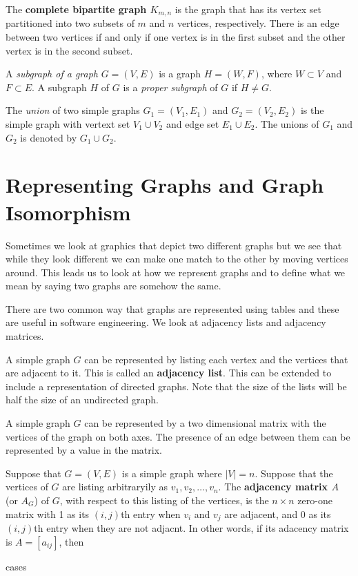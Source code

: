 \begin{definition}
The \textbf{complete bipartite graph $K_{m,n}$} is the graph that has its vertex set partitioned into two subsets of $m$ and $n$  vertices, respectively. There is an edge between two vertices if and only if one vertex is in the first subset and the other vertex is in the second subset. 
\end{definition}

\begin{definition}
A \textit{subgraph of a graph} $G=(V,E)$ is a graph $H=(W,F)$, where $ W \subset V$ and $F \subset E$. A subgraph $H$ of $G$ is a \textit{proper subgraph} of $G$ if $H \neq G$.
\end{definition}

\begin{definition}
The \textit{union} of two simple graphs $G_1 = (V_1,E_1)$ and $G_2=(V_2,E_2)$ is the simple graph with vertext set $V_1 \cup V_2$ and edge set $E_1 \cup E_2$. The unions of $G_1$ and $G_2$ is denoted by $G_1 \cup G_2$.
\end{definition}


\section {Representing Graphs and Graph Isomorphism}
Sometimes we look at graphics that depict two different graphs but we see that while they look different we can make one match to the other by moving vertices around. This leads us to look at how we represent graphs and to define what we mean by saying two graphs are somehow the same.

There are two common way that graphs are represented using tables and these are useful in software engineering. We look at adjacency lists and adjacency matrices.

\begin{definition}
A simple graph $G$ can be represented by listing each vertex and the vertices that are adjacent to it. This is called an \textbf{adjacency list}. This can be extended to include a representation of directed graphs. Note that the size of the lists will be half the size of an undirected graph.
\end{definition}

\begin{definition}
A simple graph $G$ can be represented by a two dimensional matrix with the vertices of the graph on both axes. The presence of an edge between them can be represented by a value in the matrix. 

Suppose that $G=(V,E)$ is a simple graph where $\lvert V \rvert = n$. Suppose that the vertices of $G$ are listing arbitraryily as $v_1,v_2, \dots ,v_n$. The \textbf{adjacency matrix $A$} (or $A_G$) of $G$, with respect to this listing of the vertices, is the $n \times n$ zero-one matrix with 1 as its $(i,j)$th entry when $v_i$ and $v_j$ are adjacent, and 0 as its $(i,j)$th entry when they are not adjacnt. In other words, if its adacency matrix is $A=[a_{ij}]$, then 

cases

\end{definition}

